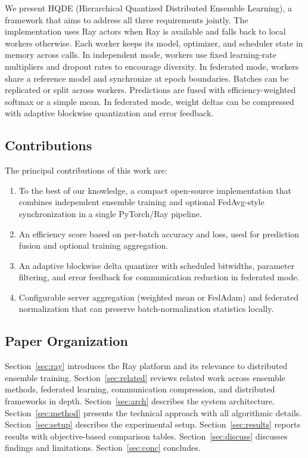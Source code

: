 \documentclass[journal,twoside]{IEEEtran}
\newcommand{\hqde}{\mbox{HQDE}\xspace}
\begin{document}
We present \hqde{} (Hierarchical Quantized Distributed Ensemble
Learning), a framework that aims to address all three requirements jointly.
The implementation uses Ray actors when Ray is available and falls back
to local workers otherwise. Each worker keeps its model, optimizer, and
scheduler state in memory across calls. In independent mode, workers use
fixed learning-rate multipliers and dropout rates to encourage diversity.
In federated mode, workers share a reference model and synchronize at
epoch boundaries. Batches can be replicated or split across workers.
Predictions are fused with efficiency-weighted softmax or a simple mean.
In federated mode, weight deltas can be compressed with adaptive
blockwise quantization and error feedback.

\subsection{Contributions}

The principal contributions of this work are:
\begin{enumerate}
  \item To the best of our knowledge, a compact open-source implementation that combines independent ensemble training and optional FedAvg-style synchronization in a single PyTorch/Ray pipeline.
  \item An efficiency score based on per-batch accuracy and loss, used for prediction fusion and optional training aggregation.
  \item An adaptive blockwise delta quantizer with scheduled bitwidths, parameter filtering, and error feedback for communication reduction in federated mode.
  \item Configurable server aggregation (weighted mean or FedAdam) and federated normalization that can preserve batch-normalization statistics locally.
\end{enumerate}

\subsection{Paper Organization}

Section~\ref{sec:ray} introduces the Ray platform and its relevance to
distributed ensemble training. Section~\ref{sec:related} reviews related
work across ensemble methods, federated learning, communication
compression, and distributed frameworks in depth.
Section~\ref{sec:arch} describes the system architecture.
Section~\ref{sec:method} presents the technical approach with all
algorithmic details. Section~\ref{sec:setup} describes the experimental
setup. Section~\ref{sec:results} reports results with objective-based
comparison tables. Section~\ref{sec:discuss} discusses findings and
limitations. Section~\ref{sec:conc} concludes.
\end{document}
